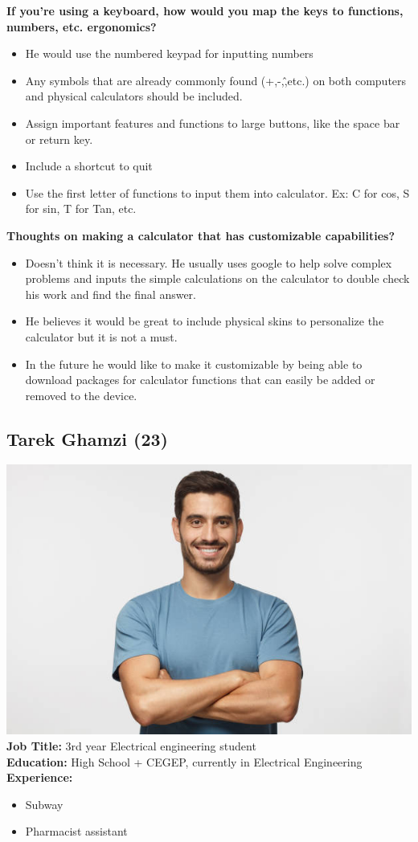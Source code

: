 \documentclass{article}
\begin{document}
\textbf{If you’re using a keyboard, how would you map the keys to functions, numbers, etc. ergonomics?}
\begin{itemize}
\itemsep0em 
\item He would use the numbered keypad for inputting numbers 
\item Any symbols that are already commonly found (+,-,\^,etc.) on both computers and physical calculators should be included.
\item Assign important features and functions to large buttons, like the space bar or return key.
\item Include a shortcut to quit
\item Use the first letter of functions to input them into calculator. Ex: C for cos, S for sin, T for Tan, etc.
\end{itemize}

\textbf{Thoughts on making a calculator that has customizable capabilities? }
\begin{itemize}
\itemsep0em 
\item Doesn’t think it is necessary. He usually uses google to help solve complex problems and inputs the simple calculations on the calculator to double check his work and find the final answer. 
\item He believes it would be great to include physical skins to personalize the calculator but it is not a must.
\item In the future he would like to make it customizable by being able to download packages for calculator functions that can easily be added or removed to the device.
\end{itemize}
\pagebreak

\subsection*{Tarek Ghamzi (23)}
\includegraphics[scale=1.5]{tarek.jpg}\\
\textbf{Job Title: }3rd year Electrical engineering student\\
\textbf{Education:} High School + CEGEP, currently in Electrical Engineering\\
\textbf{Experience:}
\begin{itemize}
\itemsep0em 
\item Subway
\item Pharmacist assistant
\end{itemize}
\end{document}

